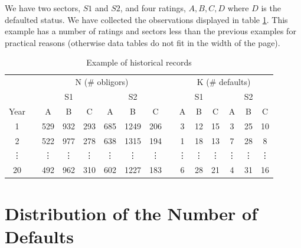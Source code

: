 \documentclass[11pt,fleqn]{book} %
\begin{document}
\begin{example}[]
	We have two sectors, $S1$ and $S2$, and four ratings, $A, B, C, D$ where 
	$D$ is the defaulted status. We have collected the observations displayed
	in table \ref{table:histdata}.
	This example has a number of ratings and sectors less than the previous 
	examples for practical reasons (otherwise data tables do not fit 
	in the width of the page).
	\begin{table}[!ht]
		\centering
		\begin{tabular}{cc|c|c|c||c|c|c|  c  |c|c|c||c|c|c|}
			\cline{3-8} \cline{10-15}
			& & \multicolumn{6}{|c|}{N (\# obligors)} & & \multicolumn{6}{|c|}{K (\# defaults)} \\
			\cline{3-8} \cline{10-15}
			& & \multicolumn{3}{|c||}{S1} & \multicolumn{3}{|c|}{S2} & & \multicolumn{3}{|c||}{S1} & \multicolumn{3}{|c|}{S2} \\
			\cline{1-1} \cline{3-8} \cline{10-15}
			\multicolumn{1}{|c|}{Year} & & A & B & C & A & B & C & & A & B & C & A & B & C \\
			\cline{1-1} \cline{3-8} \cline{10-15}
			\multicolumn{1}{|c|}{1} & & 529 & 932 & 293 & 685 & 1249 & 206 & & 3 & 12 & 15 & 3 & 25 & 10 \\
			\cline{1-1} \cline{3-8} \cline{10-15}
			\multicolumn{1}{|c|}{2} & & 522 & 977 & 278 & 638 & 1315 & 194 & & 1 & 18 & 13 & 7 & 28 & 8 \\
			\cline{1-1} \cline{3-8} \cline{10-15}
			\multicolumn{1}{|c|}{\vdots} & & \vdots & \vdots & \vdots & \vdots & \vdots & \vdots & & \vdots & \vdots & \vdots & \vdots & \vdots & \vdots \\
			\cline{1-1} \cline{3-8} \cline{10-15}
			\multicolumn{1}{|c|}{20} & & 492 & 962 & 310 & 602 & 1227 & 183 & & 6 & 28 & 21 & 4 & 31 & 16 \\
			\cline{1-1} \cline{3-8} \cline{10-15}
		\end{tabular}
		\caption{Example of historical records}
		\label{table:histdata}
	\end{table}
\end{example}

\section{Distribution of the Number of Defaults}
\end{document}
